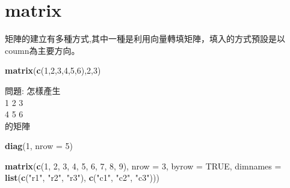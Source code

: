 \documentclass[]{book}
\newenvironment{Shaded}{\begin{snugshade}}{\end{snugshade}}
\newcommand{\KeywordTok}[1]{\textcolor[rgb]{0.13,0.29,0.53}{\textbf{#1}}}
\newcommand{\DataTypeTok}[1]{\textcolor[rgb]{0.13,0.29,0.53}{#1}}
\newcommand{\DecValTok}[1]{\textcolor[rgb]{0.00,0.00,0.81}{#1}}
\newcommand{\StringTok}[1]{\textcolor[rgb]{0.31,0.60,0.02}{#1}}
\newcommand{\OtherTok}[1]{\textcolor[rgb]{0.56,0.35,0.01}{#1}}
\newcommand{\NormalTok}[1]{#1}
\theoremstyle{definition}
\theoremstyle{definition}
\theoremstyle{definition}
\theoremstyle{remark}
\begin{document}
\section{matrix}\label{matrix}

矩陣的建立有多種方式,其中一種是利用向量轉填矩陣，填入的方式預設是以coumn為主要方向。

\begin{Shaded}
\begin{Highlighting}[]
\KeywordTok{matrix}\NormalTok{(}\KeywordTok{c}\NormalTok{(}\DecValTok{1}\NormalTok{,}\DecValTok{2}\NormalTok{,}\DecValTok{3}\NormalTok{,}\DecValTok{4}\NormalTok{,}\DecValTok{5}\NormalTok{,}\DecValTok{6}\NormalTok{),}\DecValTok{2}\NormalTok{,}\DecValTok{3}\NormalTok{)}
\end{Highlighting}
\end{Shaded}

問題: 怎樣產生\\
1 2 3\\
4 5 6\\
的矩陣

\begin{Shaded}
\begin{Highlighting}[]
\KeywordTok{diag}\NormalTok{(}\DecValTok{1}\NormalTok{, }\DataTypeTok{nrow =} \DecValTok{5}\NormalTok{)}
\end{Highlighting}
\end{Shaded}

\begin{Shaded}
\begin{Highlighting}[]
\KeywordTok{matrix}\NormalTok{(}\KeywordTok{c}\NormalTok{(}\DecValTok{1}\NormalTok{, }\DecValTok{2}\NormalTok{, }\DecValTok{3}\NormalTok{, }\DecValTok{4}\NormalTok{, }\DecValTok{5}\NormalTok{, }\DecValTok{6}\NormalTok{, }\DecValTok{7}\NormalTok{, }\DecValTok{8}\NormalTok{, }\DecValTok{9}\NormalTok{), }\DataTypeTok{nrow =} \DecValTok{3}\NormalTok{, }\DataTypeTok{byrow =} \OtherTok{TRUE}\NormalTok{, }\DataTypeTok{dimnames =} \KeywordTok{list}\NormalTok{(}\KeywordTok{c}\NormalTok{(}\StringTok{"r1"}\NormalTok{, }\StringTok{"r2"}\NormalTok{, }\StringTok{"r3"}\NormalTok{), }\KeywordTok{c}\NormalTok{(}\StringTok{"c1"}\NormalTok{, }\StringTok{"c2"}\NormalTok{, }\StringTok{"c3"}\NormalTok{)))}
\end{Highlighting}
\end{Shaded}
\end{document}
